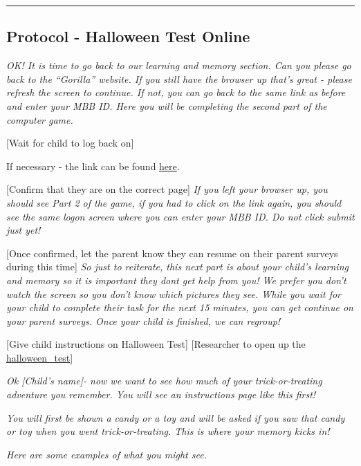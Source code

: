 \documentclass[]{book}
\begin{document}
\begin{center}\rule{0.5\linewidth}{0.5pt}\end{center}

\hypertarget{protocol---halloween-test-online}{%
\subsection{Protocol - Halloween Test Online}\label{protocol---halloween-test-online}}

\emph{OK! It is time to go back to our learning and memory section. Can you please go back to the ``Gorilla'' website. If you still have the browser up that's great - please refresh the screen to continue. If not, you can go back to the same link as before and enter your MBB ID. Here you will be completing the second part of the computer game.}

{[}Wait for child to log back on{]}

If necessary - the link can be found \href{https://research.sc/participant/login/20451/publicid}{here}.

{[}Confirm that they are on the correct page{]} \emph{If you left your browser up, you should see Part 2 of the game, if you had to click on the link again, you should see the same logon screen where you can enter your MBB ID. Do not click submit just yet!}

{[}Once confirmed, let the parent know they can resume on their parent surveys during this time{]} \emph{So just to reiterate, this next part is about your child's learning and memory so it is important they dont get help from you! We prefer you don't watch the screen so you don't know which pictures they see. While you wait for your child to complete their task for the next 15 minutes, you can get continue on your parent surveys. Once your child is finished, we can regroup!}

{[}Give child instructions on Halloween Test{]} {[}Researcher to open up the \href{https://ucla.app.box.com/file/709479264913}{halloween\_test}{]}

\emph{Ok {[}Child's name{]}- now we want to see how much of your trick-or-treating adventure you remember. You will see an instructions page like this first!}

\emph{You will first be shown a candy or a toy and will be asked if you saw that candy or toy when you went trick-or-treating. This is where your memory kicks in!}

\emph{Here are some examples of what you might see.}
\end{document}

